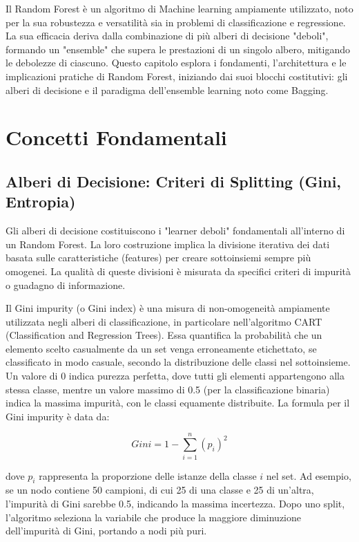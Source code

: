 \documentclass[a4paper,12pt]{report}
\begin{document}
	Il Random Forest è un algoritmo di Machine learning ampiamente utilizzato, noto per la sua robustezza e versatilità sia in problemi di classificazione e regressione. La sua efficacia deriva dalla combinazione di più alberi di decisione "deboli", formando un "ensemble" che supera le prestazioni di un singolo albero, mitigando le debolezze di ciascuno. Questo capitolo esplora i fondamenti, l'architettura e le implicazioni pratiche di Random Forest, iniziando dai suoi blocchi costitutivi: gli alberi di decisione e il paradigma dell'ensemble learning noto come Bagging.
	
	\section{Concetti Fondamentali}
	
	\subsection{Alberi di Decisione: Criteri di Splitting (Gini, Entropia)}
	
	Gli alberi di decisione costituiscono i "learner deboli" fondamentali all'interno di un Random Forest. La loro costruzione implica la divisione iterativa dei dati basata sulle caratteristiche (features) per creare sottoinsiemi sempre più omogenei. La qualità di queste divisioni è misurata da specifici criteri di impurità o guadagno di informazione.
	
	Il Gini impurity (o Gini index) è una misura di non-omogeneità ampiamente utilizzata negli alberi di classificazione, in particolare nell'algoritmo CART (Classification and Regression Trees). Essa quantifica la probabilità che un elemento scelto casualmente da un set venga erroneamente etichettato, se classificato in modo casuale, secondo la distribuzione delle classi nel sottoinsieme. Un valore di 0 indica purezza perfetta, dove tutti gli elementi appartengono alla stessa classe, mentre un valore massimo di 0.5 (per la classificazione binaria) indica la massima impurità, con le classi equamente distribuite. La formula per il Gini impurity è data da:
	
	$$Gini = 1 - \sum_{i=1}^{n} (p_i)^2$$
	
	dove $p_i$ rappresenta la proporzione delle istanze della classe $i$ nel set. Ad esempio, se un nodo contiene 50 campioni, di cui 25 di una classe e 25 di un'altra, l'impurità di Gini sarebbe 0.5, indicando la massima incertezza. Dopo uno split, l'algoritmo seleziona la variabile che produce la maggiore diminuzione dell'impurità di Gini, portando a nodi più puri.
	
\end{document}
